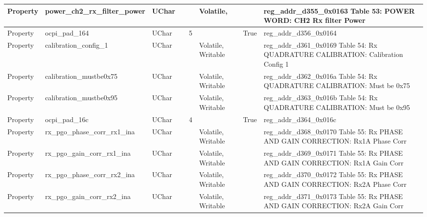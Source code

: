 \documentclass{article}
\begin{document}
\begin{scriptsize}
\begin{longtable}{|p{2cm}|p{5cm}|p{1cm}|p{2cm}|p{2cm}|p{1.75cm}|p{1.5cm}|p{5.1cm}|}
  \hline
  Property & power\_ch2\_rx\_filter\_power                            & UChar &                  &                  & Volatile,           &         & reg\_addr\_d355\_0x0163 Table 53: POWER WORD: CH2 Rx filter Power \\
  \hline
  Property & ocpi\_pad\_164                                           & UChar &                  & 5                &                     & True    & reg\_addr\_d356\_0x0164 \\
  \hline
  Property & calibration\_config\_1                                   & UChar &                  &                  & Volatile,  Writable &         & reg\_addr\_d361\_0x0169 Table 54: Rx QUADRATURE CALIBRATION: Calibration Config 1 \\
  \hline
  Property & calibration\_mustbe0x75                                  & UChar &                  &                  & Volatile,  Writable &         & reg\_addr\_d362\_0x016a Table 54: Rx QUADRATURE CALIBRATION: Must be 0x75 \\
  \hline
  Property & calibration\_mustbe0x95                                  & UChar &                  &                  & Volatile,  Writable &         & reg\_addr\_d363\_0x016b Table 54: Rx QUADRATURE CALIBRATION: Must be 0x95 \\
  \hline
  Property & ocpi\_pad\_16c                                           & UChar &                  & 4                &                     & True    & reg\_addr\_d364\_0x016c \\
  \hline
  Property & rx\_pgo\_phase\_corr\_rx1\_ina                           & UChar &                  &                  & Volatile,  Writable &         & reg\_addr\_d368\_0x0170 Table 55: Rx PHASE AND GAIN CORRECTION: Rx1A Phase Corr \\
  \hline
  Property & rx\_pgo\_gain\_corr\_rx1\_ina                            & UChar &                  &                  & Volatile,  Writable &         & reg\_addr\_d369\_0x0171 Table 55: Rx PHASE AND GAIN CORRECTION: Rx1A Gain Corr \\
  \hline
  Property & rx\_pgo\_phase\_corr\_rx2\_ina                           & UChar &                  &                  & Volatile,  Writable &         & reg\_addr\_d370\_0x0172 Table 55: Rx PHASE AND GAIN CORRECTION: Rx2A Phase Corr \\
  \hline
  Property & rx\_pgo\_gain\_corr\_rx2\_ina                            & UChar &                  &                  & Volatile,  Writable &         & reg\_addr\_d371\_0x0173 Table 55: Rx PHASE AND GAIN CORRECTION: Rx2A Gain Corr \\

\end{longtable}
\end{scriptsize}
\end{document}
